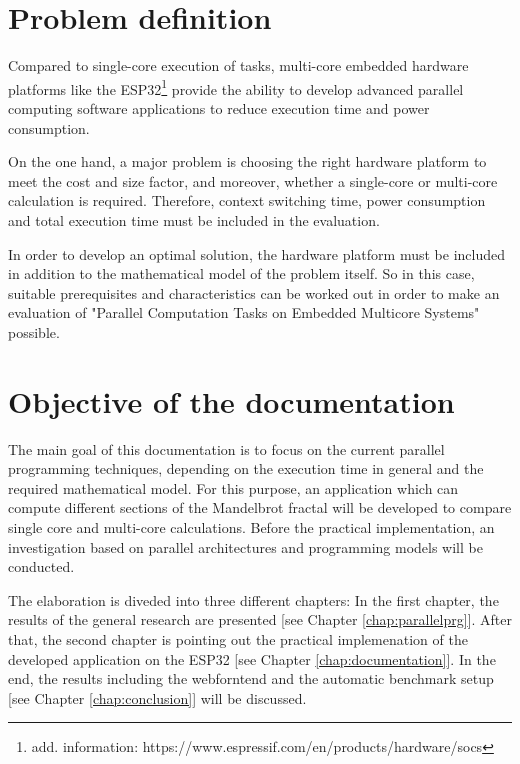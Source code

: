 \section{Problem definition}

Compared to single-core execution of tasks, multi-core embedded hardware platforms like the ESP32\footnote{add. information: https://www.espressif.com/en/products/hardware/socs} provide the ability to develop advanced parallel computing software applications to reduce execution time and power consumption.

On the one hand, a major problem is choosing the right hardware platform to meet the cost and size factor, and moreover, whether a single-core or multi-core calculation is required. Therefore, context switching time, power consumption and total execution time must be included in the evaluation.

In order to develop an optimal solution, the hardware platform must be included in addition to the mathematical model of the problem itself. So in this case, suitable prerequisites and characteristics can be worked out in order to make an evaluation of "Parallel Computation Tasks on Embedded Multicore Systems" possible.

\section{Objective of the documentation}

The main goal of this documentation is to focus on the current parallel programming techniques, depending on the execution time in general and the required mathematical model. For this purpose, an application which can compute different sections of the Mandelbrot fractal \parencite[see][p11]{article18} will be developed to compare single core and multi-core calculations. Before the practical implementation, an investigation based on parallel architectures and programming models will be conducted.

The elaboration is diveded into three different chapters: In the first chapter, the results of the general research are presented [see Chapter \ref{chap:parallelprg}]. After that, the second chapter is pointing out the practical implemenation of the developed application on the ESP32 [see Chapter \ref{chap:documentation}]. In the end, the results including the webforntend and the automatic benchmark setup [see Chapter \ref{chap:conclusion}] will be discussed.